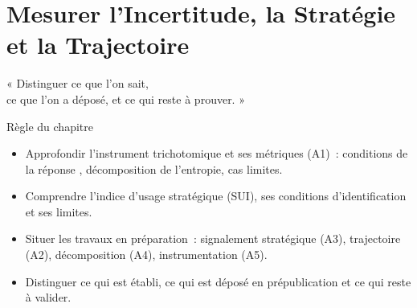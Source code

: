 
\chapter{Mesurer l'Incertitude, la Stratégie et la Trajectoire}
\label{chap:incertitude}

\epigraph{%
    « Distinguer ce que l'on sait,\\
    ce que l'on a déposé, et ce qui reste à prouver. »%
}{Règle du chapitre}


\begin{boxobjectifs}
\begin{itemize}
    \item Approfondir l'instrument trichotomique et ses métriques (A1)~:
          conditions de la réponse \NEK{}, décomposition de l'entropie, cas
          limites.
    \item Comprendre l'indice d'usage stratégique (SUI), ses conditions
          d'identification et ses limites.
    \item Situer les travaux en préparation~: signalement stratégique (A3),
          trajectoire (A2), décomposition (A4), instrumentation (A5).
    \item Distinguer ce qui est établi, ce qui est déposé en prépublication
          et ce qui reste à valider.
\end{itemize}
\end{boxobjectifs}

